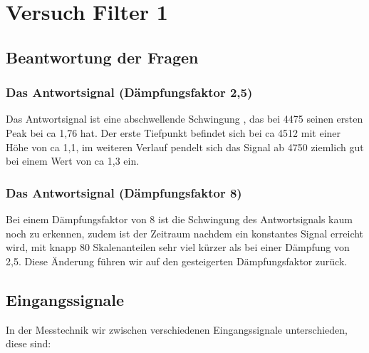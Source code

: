 




\maketitle



\tableofcontents

\newpage



\section{Versuch Filter 1}


\subsection{Beantwortung der Fragen}

\subsubsection*{Das Antwortsignal (Dämpfungsfaktor 2,5)}

Das Antwortsignal ist eine abschwellende Schwingung , das bei 4475 seinen ersten Peak bei ca 1,76 hat. Der erste Tiefpunkt befindet sich bei ca 4512 mit einer Höhe von ca 1,1, im weiteren Verlauf pendelt sich das Signal ab 4750 ziemlich gut bei einem Wert von ca 1,3 ein.


\subsubsection*{Das Antwortsignal (Dämpfungsfaktor 8)}

Bei einem Dämpfungsfaktor von 8 ist die Schwingung des Antwortsignals kaum noch zu erkennen, zudem ist der Zeitraum nachdem ein konstantes Signal erreicht wird, mit knapp 80 Skalenanteilen sehr viel kürzer als bei einer Dämpfung von 2,5. Diese Änderung führen wir auf den gesteigerten Dämpfungsfaktor zurück.


\subsection{Eingangssignale}

In der Messtechnik wir zwischen verschiedenen Eingangssignale unterschieden, diese sind:

